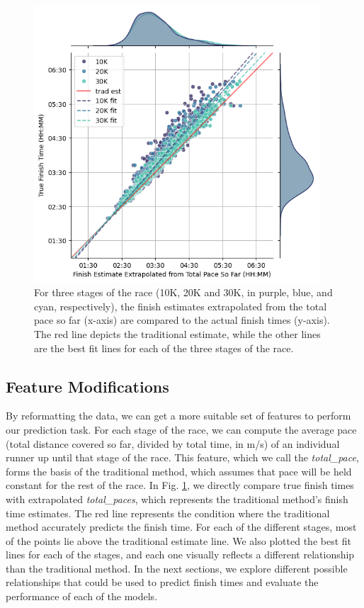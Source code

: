 \documentclass[USenglish,twocolumn]{article}
\theoremstyle{dgthm}
\theoremstyle{dgdef}
\begin{document}
\begin{figure}[ht]
    \centering
    \includegraphics[width=4.2in]{../analysis/bos_data_scatter.png}
    \caption{For three stages of the race (10K, 20K and  30K, in purple, blue, and cyan, respectively), the finish estimates extrapolated from the total pace so far (x-axis) are compared to the actual finish times (y-axis). The red line depicts the traditional estimate, while the other lines are the best fit lines for each of the three stages of the race.}
    \label{fig:scatter}
\end{figure}

\subsection{Feature Modifications} 

By reformatting the data, we can get a more suitable set of features to perform our prediction task. For each stage of the race, we can compute the average pace (total distance covered so far, divided by total time, in m/s) of an individual runner up until that stage of the race. This feature, which we call the \emph{total\_pace}, forms the basis of the traditional method, which assumes that pace will be held constant for the rest of the race. In Fig. \ref{fig:scatter}, we directly compare true finish times with extrapolated \emph{total\_paces}, which represents the traditional method's finish time estimates. The red line represents the condition where the traditional method accurately predicts the finish time. For each of the different stages, most of the points lie above the traditional estimate line. We also plotted the best fit lines for each of the stages, and each one visually reflects a different relationship than the traditional method. In the next sections, we explore different possible relationships that could be used to predict finish times and evaluate the performance of each of the models.
\end{document}
